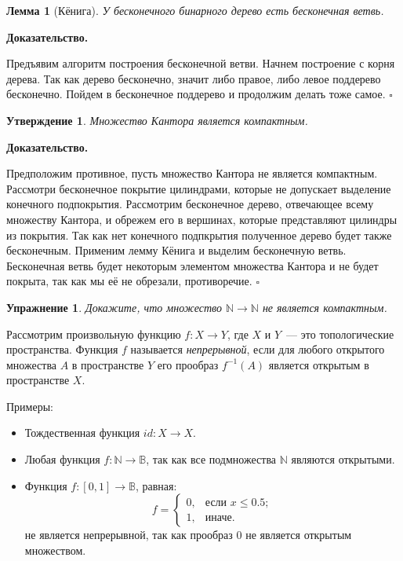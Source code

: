 \documentclass{article}
\renewenvironment{proof}{\par\noindent%
{\bf Доказательство.\par\nopagebreak}}{\unskip\nobreak\enskip$\square$\par\bigskip}
\newtheorem{mylemma}{Лемма}
\newtheorem{myclaim}{Утверждение}
\newtheorem{exersize}{Упражнение}
\begin{document}
\begin{mylemma}[Кёнига]
У бесконечного бинарного дерево есть бесконечная ветвь.
\end{mylemma}

\begin{proof}
Предъявим алгоритм построения бесконечной ветви. Начнем построение с корня дерева.
Так как дерево бесконечно, значит либо правое, либо левое поддерево бесконечно.
Пойдем в бесконечное поддерево и продолжим делать тоже самое.
\end{proof}

\begin{myclaim}
Множество Кантора является компактным.
\end{myclaim}

\begin{proof}
Предположим противное, пусть множество Кантора не является компактным.
Рассмотри бесконечное покрытие цилиндрами, которые не допускает выделение конечного подпокрытия.
Рассмотрим бесконечное дерево, отвечающее всему множеству Кантора, и обрежем
его в вершинах, которые представляют цилиндры из покрытия. Так как нет конечного подпкрытия
полученное дерево будет также бесконечным. Применим лемму Кёнига и выделим бесконечную ветвь.
Бесконечная ветвь будет некоторым элементом множества Кантора и не будет покрыта, так как
мы её не обрезали, противоречие.
\end{proof}

\begin{exersize}
Докажите, что множество $\mathbb{N} \to \mathbb{N}$ не является компактным.
\end{exersize}

\medskip

Рассмотрим произвольную функцию $f : X \to Y$, где $X$ и $Y$~--- это топологические пространства.
Функция $f$ называется \emph{непрерывной}, если для любого открытого множества $A$ в пространстве $Y$ 
его прообраз $f^{-1}(A)$ является открытым в пространстве $X$.

Примеры:
\begin{itemize}
\item
Тождественная функция $id: X \to X$.

\item
Любая функция $f : \mathbb{N} \to \mathbb{B}$, так как все подмножества $\mathbb{N}$
являются открытыми.

\item
Функция $f : [0, 1] \to \mathbb{B}$, равная:
$$
f = 
\begin{cases}
0, & \text{если $x \leq 0.5$}; \\
1, & \text{иначе}.
\end{cases}
$$
не является непрерывной, так как прообраз $0$ не является открытым множеством.
\end{itemize}
\end{document}
